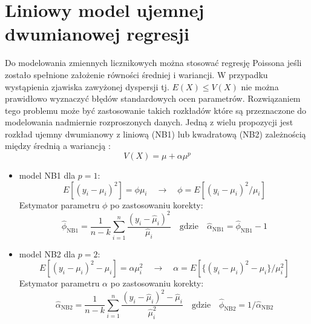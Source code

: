 \documentclass[polish,]{book}
\begin{document}
\hypertarget{R62}{%
\section{Liniowy model ujemnej dwumianowej regresji}\label{R62}}

Do modelowania zmiennych licznikowych można stosować regresję Poissona jeśli zostało spełnione założenie równości średniej i wariancji. W przypadku wystąpienia zjawiska zawyżonej dyspersji tj. \(E(X)\leq V(X)\) nie można prawidłowo wyznaczyć błędów standardowych ocen parametrów. Rozwiązaniem tego problemu może być zastosowanie takich rozkładów które są przeznaczone do modelowania nadmiernie rozproszonych danych. Jedną z wielu propozycji \citep{pois2016} jest rozkład ujemny dwumianowy z liniową (NB1) lub kwadratową (NB2) zależnością między średnią a wariancją \citep{pois1998}:
\begin{equation}
V(X)=\mu+\alpha\mu^p
\label{eq:ub06}
\end{equation}

\begin{itemize}
\item
  model NB1 dla \(p=1\):
  \begin{equation}
  E[(y_i-\mu_i)^2]=\phi\mu_i\quad\longrightarrow\quad\phi = E[(y_i-\mu_i)^2/\mu_i]
  \label{eq:ub07}
  \end{equation}
  Estymator parametru \(\phi\) po zastosowaniu korekty:
  \begin{equation}
  \hat{\phi}_{\mathrm{NB1}}=\frac{1}{n-k}\sum_{i=1}^{n}\frac{(y_i-\hat{\mu}_i)^2}{\hat{\mu}_i}\quad\mathrm{gdzie}\quad\hat{\alpha}_{\mathrm{NB1}}=\hat{\phi}_{\mathrm{NB1}}-1
  \label{eq:ub08}
  \end{equation}
\item
  model NB2 dla \(p=2\):
  \begin{equation}
  E[(y_i-\mu_i)^2-\mu_i]=\alpha\mu_i^2\quad\longrightarrow\quad\alpha = E[\{(y_i-\mu_i)^2-\mu_i\}/\mu_i^2]
  \label{eq:ub09}
  \end{equation}
  Estymator parametru \(\alpha\) po zastosowaniu korekty:
  \begin{equation}
  \hat{\alpha}_{\mathrm{NB2}}=\frac{1}{n-k}\sum_{i=1}^{n}\frac{(y_i-\hat{\mu}_i)^2-\hat{\mu}_i}{\hat{\mu}^2_i}\quad\mathrm{gdzie}\quad\hat{\phi}_{\mathrm{NB2}}=1/\hat{\alpha}_{\mathrm{NB2}}
  \label{eq:ub10}
  \end{equation}
\end{itemize}
\end{document}
